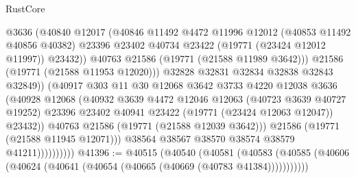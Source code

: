 \begin{lexlean}{RustCore}
\begin{coremodule}
                                  @3636
                                  (@40840
                                    @12017
                                    (@40846
                                      @11492
                                      @4472
                                      @11996
                                      @12012
                                      (@40853 @11492 @40856 @40382)
                                      @23396
                                      @23402
                                      @40734
                                      @23422
                                      (@19771 (@23424 @12012 @11997))
                                      @23432))
                                  @40763
                                  @21586
                                  (@19771 (@21588 @11989 @3642)))
                                @21586
                                (@19771 (@21588 @11953 @12020)))
                              @32828
                              @32831
                              @32834
                              @32838
                              @32843
                              @32849))
                          (@40917
                            @303
                            @11
                            @30
                            @12068
                            @3642
                            @3733
                            @4220
                            @12038
                            @3636
                            (@40928
                              @12068
                              (@40932
                                @3639
                                @4472
                                @12046
                                @12063
                                (@40723 @3639 @40727 @19252)
                                @23396
                                @23402
                                @40941
                                @23422
                                (@19771 (@23424 @12063 @12047))
                                @23432))
                            @40763
                            @21586
                            (@19771 (@21588 @12039 @3642)))
                          @21586
                          (@19771 (@21588 @11945 @12071)))
                        @38564
                        @38567
                        @38570
                        @38574
                        @38579
                        @41211))))))))))
@41396 := @40515
    (@40540
      (@40581
        (@40583 (@40585 (@40606 (@40624 (@40641 (@40654 (@40665 (@40669 (@40783 @41384)))))))))))

\end{coremodule}
\end{lexlean}

